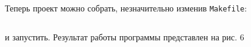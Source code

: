 Теперь проект можно собрать, незначительно изменив \verb|Makefile|:
\inputminted{Makefile}{Makefile} 
и запустить. Результат работы программы представлен на рис. 6
